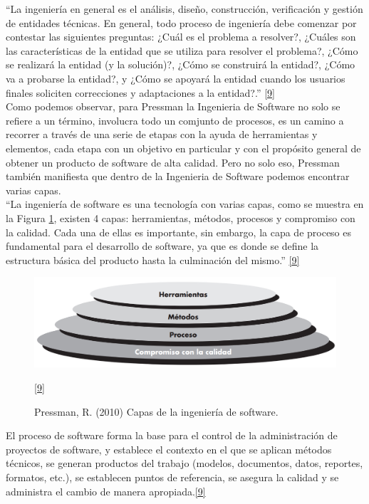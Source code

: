 ``La ingeniería en general es el análisis, diseño, construcción, verificación y gestión de entidades técnicas. En general, todo proceso de ingeniería debe comenzar por contestar las siguientes preguntas: ¿Cuál es el problema a
resolver?, ¿Cuáles son las características de la entidad que se utiliza para resolver el problema?, ¿Cómo se realizará la entidad (y la solución)?, ¿Cómo se construirá la entidad?, ¿Cómo va a probarse la entidad?, y ¿Cómo se apoyará la entidad cuando los usuarios finales soliciten correcciones y adaptaciones a la entidad?.'' \hyperlink{b09}{[9]} \\

Como podemos observar, para Pressman la Ingenieria de Software no solo se refiere a un término, involucra todo un comjunto de procesos, es un camino a recorrer a través de una serie de etapas con la ayuda de herramientas y elementos, cada etapa con un objetivo en particular y con el propósito general de obtener un producto de software de alta calidad. Pero no solo eso, Pressman también manifiesta que dentro de la Ingenieria de Software podemos encontrar varias capas.\\ 

``La ingeniería de software es una tecnología con varias capas, como se muestra en la Figura \ref{fig:capas_is}, existen 4 capas: herramientas, métodos, procesos y compromiso con la calidad. Cada una de ellas es importante, sin embargo, la capa de proceso es fundamental para el desarrollo de software, ya que es donde se define la estructura básica del producto hasta la culminación del mismo.''  \hyperlink{b09}{[9]} \\

\begin{figure}[H]
	\begin{center}
		\includegraphics[width=.95\textwidth]{images/CapasIS}
		\caption{Pressman, R. (2010) Capas de la ingeniería de software.}
		\hyperlink{b09}{[9]}
		\label{fig:capas_is}
	\end{center}
\end{figure}

El proceso de software forma la base para el control de la administración de proyectos de software, y establece el contexto en el que se aplican métodos técnicos, se generan productos del trabajo (modelos, documentos, datos, reportes, formatos, etc.), se establecen puntos de referencia, se asegura la calidad y se administra el cambio de manera apropiada.\hyperlink{b09}{[9]} 

